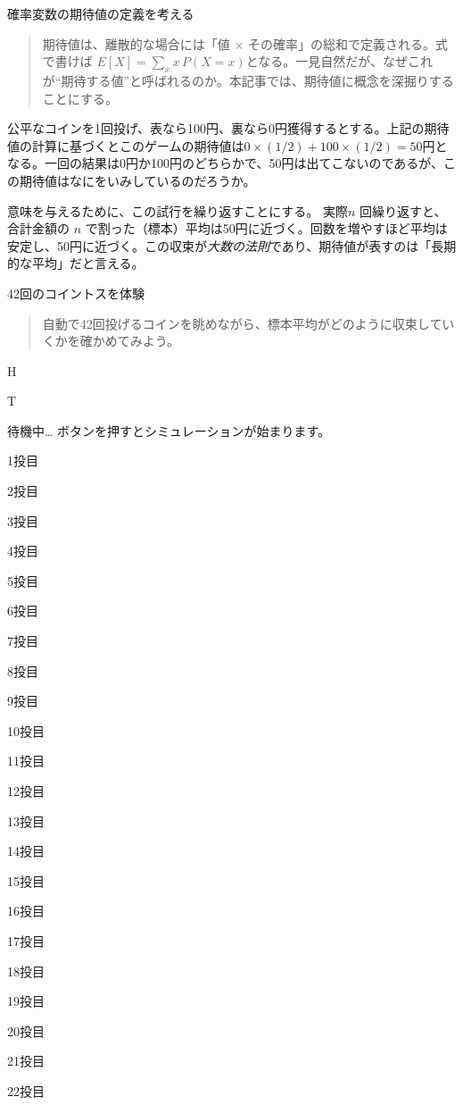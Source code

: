 \documentclass[uplatex,dvipdfmx,11pt,a4paper,openany]{bxjsbook}
\newenvironment{noteblock}{\begin{quote}\color{black!72}\small}{\end{quote}}
\newenvironment{leadparagraph}{\begin{quote}\large\color{ColumnInk}}{\end{quote}}
\newcommand{\columnheading}[1]{\par\medskip{\large\color{ColumnInk}#1}\par\smallskip}
\begin{document}
\clearpage
\begin{columnbox}{確率変数の期待値の定義を考える}
\begin{leadparagraph}
期待値は、離散的な場合には「値 × その確率」の総和で定義される。式で書けば $E[X]=\sum_x x\,P(X=x)$となる。一見自然だが、なぜこれが“期待する値”と呼ばれるのか。本記事では、期待値に概念を深掘りすることにする。
\end{leadparagraph}

\columnheading{コイン投げの長期平均}
公平なコインを1回投げ、表なら100円、裏なら0円獲得するとする。上記の期待値の計算に基づくとこのゲームの期待値は$0\times (1/2)+100\times (1/2)=50$円となる。一回の結果は0円か100円のどちらかで、50円は出てこないのであるが、この期待値はなにをいみしているのだろうか。

意味を与えるために、この試行を繰り返すことにする。 実際$n$ 回繰り返すと、合計金額の $n$ で割った（標本）平均は50円に近づく。回数を増やすほど平均は安定し、50円に近づく。この収束が\emph{大数の法則}であり、期待値が表すのは「長期的な平均」だと言える。

42回のコイントスを体験

\begin{noteblock}
自動で42回投げるコインを眺めながら、標本平均がどのように収束していくかを確かめてみよう。
\end{noteblock}

H

T

待機中… ボタンを押すとシミュレーションが始まります。

1投目

2投目

3投目

4投目

5投目

6投目

7投目

8投目

9投目

10投目

11投目

12投目

13投目

14投目

15投目

16投目

17投目

18投目

19投目

20投目

21投目

22投目


\end{columnbox}
\end{document}
